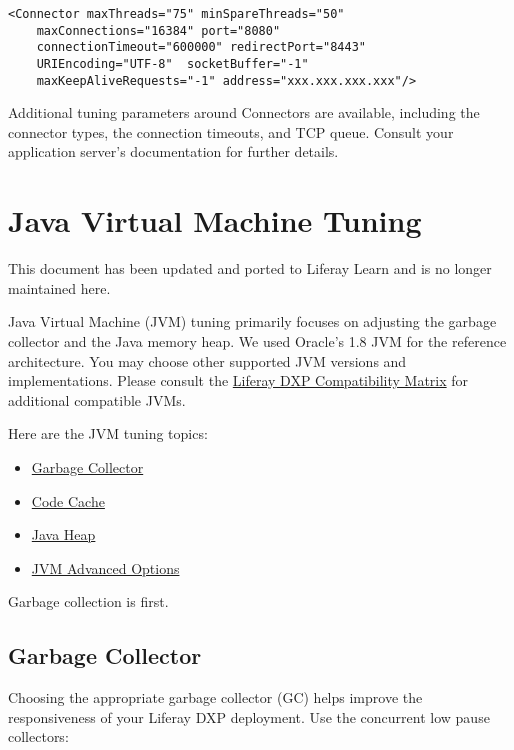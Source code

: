 \begin{verbatim}
<Connector maxThreads="75" minSpareThreads="50"
    maxConnections="16384" port="8080"     
    connectionTimeout="600000" redirectPort="8443"
    URIEncoding="UTF-8"  socketBuffer="-1"     
    maxKeepAliveRequests="-1" address="xxx.xxx.xxx.xxx"/>
\end{verbatim}

Additional tuning parameters around Connectors are available, including
the connector types, the connection timeouts, and TCP queue. Consult
your application server's documentation for further details.

\chapter{Java Virtual Machine Tuning}\label{java-virtual-machine-tuning}

{This document has been updated and ported to Liferay Learn and is no
longer maintained here.}

Java Virtual Machine (JVM) tuning primarily focuses on adjusting the
garbage collector and the Java memory heap. We used Oracle's 1.8 JVM for
the reference architecture. You may choose other supported JVM versions
and implementations. Please consult the
\href{https://web.liferay.com/group/customer/dxp/support/compatibility-matrix}{Liferay
DXP Compatibility Matrix} for additional compatible JVMs.

Here are the JVM tuning topics:

\begin{itemize}
\tightlist
\item
  \hyperref[garbage-collector]{Garbage Collector}
\item
  \hyperref[code-cache]{Code Cache}
\item
  \hyperref[java-heap]{Java Heap}
\item
  \hyperref[jvm-advanced-options]{JVM Advanced Options}
\end{itemize}

Garbage collection is first.

\section{Garbage Collector}\label{garbage-collector}

Choosing the appropriate garbage collector (GC) helps improve the
responsiveness of your Liferay DXP deployment. Use the concurrent low
pause collectors:


